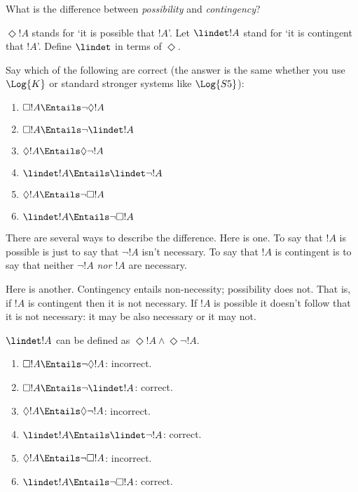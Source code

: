 \documentclass[../../../include/open-logic-section]{subfiles}
\begin{document}
\begin{prob}
    What is the difference between \emph{possibility} and \emph{contingency}?

    $\Diamond !A$ stands for `it is possible that $!A$'. Let $\lindet !A$
    stand for `it is contingent that $!A$'. Define $\lindet$ in terms of $\Diamond$.

    Say which of the following are correct (the answer is the same whether
    you use $\Log{K}$ or standard stronger systems like $\Log{S5}$):
    \begin{enumerate}
        \item $\Box !A \Entails \lnot \Diamond !A$
        \item $\Box !A \Entails \lnot \lindet !A$
        \item $\Diamond !A \Entails \Diamond \lnot !A$
        \item $\lindet !A \Entails \lindet \lnot !A$
        \item $\Diamond !A \Entails \lnot\Box !A$
        \item $\lindet !A \Entails \lnot\Box !A$
    \end{enumerate}

    \begin{ans}There are several ways to describe the difference.
        Here is one. To say that $!A$ is possible is just to say that 
        $\lnot!A$ isn't necessary. To say that $!A$ is contingent is to
        say that neither $\lnot!A$ \emph{nor $!A$} are necessary. 

        Here is another. Contingency entails non-necessity; possibility 
        does not. That is, if $!A$ is contingent then it is not necessary.
        If $!A$ is possible it doesn't follow that it is not necessary: it 
        may be also necessary or it may not.

        $\lindet !A$ can be defined as $\Diamond!A\land\Diamond\lnot!A$.
        
        \begin{enumerate}
            \item $\Box !A \Entails \lnot \Diamond !A$: incorrect. 
            \item $\Box !A \Entails \lnot \lindet !A$: correct.
            \item $\Diamond !A \Entails \Diamond \lnot !A$: incorrect. 
            \item $\lindet !A \Entails \lindet \lnot !A$: correct.
            \item $\Diamond !A \Entails \lnot\Box !A$: incorrect.
            \item $\lindet !A \Entails \lnot\Box !A$: correct.
        \end{enumerate}
    \end{ans}
\end{prob}
\end{document}
